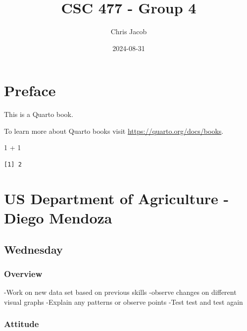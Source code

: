 \documentclass[
  letterpaper,
  DIV=11,
  numbers=noendperiod]{scrreprt}
\title{CSC 477 - Group 4}
\author{Chris Jacob}
\date{2024-08-31}
\newenvironment{Shaded}{\begin{snugshade}}{\end{snugshade}}
\newcommand{\DecValTok}[1]{\textcolor[rgb]{0.68,0.00,0.00}{#1}}
\newcommand{\SpecialCharTok}[1]{\textcolor[rgb]{0.37,0.37,0.37}{#1}}
\renewcommand*\contentsname{Table of contents}
\newcommand\contentsname{Table of contents}
\begin{document}
\maketitle

\renewcommand*\contentsname{Table of contents}
{
\hypersetup{linkcolor=}
\setcounter{tocdepth}{2}
\tableofcontents
}


\chapter*{Preface}\label{preface}


This is a Quarto book.

To learn more about Quarto books visit
\url{https://quarto.org/docs/books}.

\begin{Shaded}
\begin{Highlighting}[]
\DecValTok{1} \SpecialCharTok{+} \DecValTok{1}
\end{Highlighting}
\end{Shaded}

\begin{verbatim}
[1] 2
\end{verbatim}


\chapter{US Department of Agriculture - Diego
Mendoza}\label{us-department-of-agriculture---diego-mendoza}

\section{Wednesday}\label{wednesday}

\subsection{Overview}\label{overview}

-Work on new data set based on previous skills -observe changes on
different visual graphs -Explain any patterns or observe points -Test
test and test again

\subsection{Attitude}\label{attitude}
\end{document}
